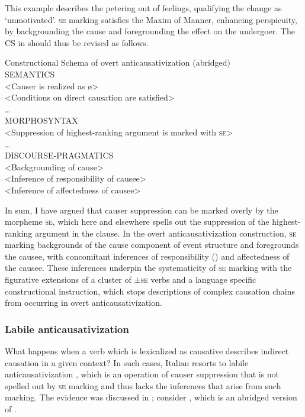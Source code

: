 \documentclass[output=paper,colorlinks,citecolor=brown
]{langscibook}
\begin{document}
This example describes the petering out of feelings, qualifying the change as ‘unmotivated’. \textsc{se} marking satisfies the Maxim of Manner, enhancing perspicuity, by backgrounding the cause and foregrounding the effect on the undergoer. The CS in  should thus be revised as follows.

\ea \label{bentley_example_58}
Constructional Schema of overt anticausativization (abridged)\\
SEMANTICS\\
<Causer is realized as \o>\\
<Conditions on direct causation are satisfied>\\
 \ldots \\
MORPHOSYNTAX\\
<Suppression of highest-ranking argument is marked with \textsc{se}>\\
 \ldots \\
DISCOURSE-PRAGMATICS\\
<Backgrounding of cause>\\
<Inference of responsibility of causee>\\
<Inference of affectedness of causee>\\
\z

In sum, I have argued that causer suppression can be marked overly by the morpheme \textsc{se}, which here and elsewhere spells out the suppression of the highest-ranking argument in the clause. In the overt anticausativization construction, \textsc{se} marking backgrounds of the cause component of event structure and foregrounds the causee, with concomitant inferences of responsibility (\cites[24 and references therein]{zribi1987reflexivite}{kailuweit2012construcciones}{martin2014anticausatives}) and affectedness \citep{lyons1969introduction} of the causee. These inferences underpin the systematicity of \textsc{se} marking with the figurative extensions of a cluster of ±\textsc{se} verbs and a language specific constructional instruction, which stops descriptions of complex causation chains from occurring in overt anticausativization. 

\subsubsection{Labile anticausativization}
\label{bentley_section_5.4.2}
What happens when a verb which is lexicalized as causative describes indirect causation in a given
context? In such cases, Italian resorts to labile anticausativization \citep{bentley2021two}, which
is an operation of causer suppression that is not spelled out by \textsc{se} marking and thus lacks
the inferences that arise from such marking. The evidence was discussed in ; consider , which is an abridged version of . 
\end{document}
